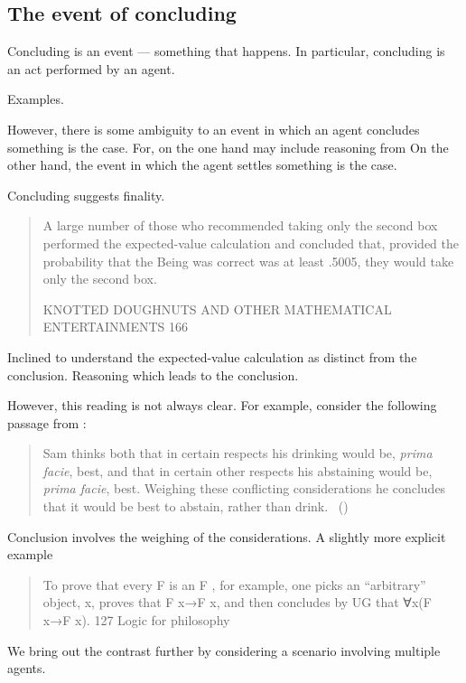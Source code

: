 \subsection{The event of concluding}
\label{cha:introduction:sec:concluding:event}

\begin{note}
  Concluding is an event --- something that happens.
  In particular, concluding is an act performed by an agent.

  Examples.
\end{note}

\begin{note}
  However, there is some ambiguity to an event in which an agent concludes something is the case.
  For, on the one hand may include reasoning from
  On the other hand, the event in which the agent settles something is the case.

  Concluding suggests finality.

  \begin{quote}
    A large number of those who recommended taking only the second box performed the expected-value calculation and concluded that, provided the probability that the Being was correct was at least .5005, they would take only the second box.

    KNOTTED DOUGHNUTS AND OTHER MATHEMATICAL ENTERTAINMENTS 166
  \end{quote}

  Inclined to understand the expected-value calculation as distinct from the conclusion.
  Reasoning which leads to the conclusion.

  However, this reading is not always clear.
  For example, consider the following passage from \citeyear{Bratman:1979aa}:

  \begin{quote}
    Sam thinks both that in certain respects his drinking would be, \emph{prima facie}, best, and that in certain other respects his abstaining would be, \emph{prima facie}, best.
    Weighing these conflicting considerations he concludes that it would be best to abstain, rather than drink.%
    \mbox{ }\hfill\mbox{(\citeyear[156]{Bratman:1979aa})}
  \end{quote}

  Conclusion involves the weighing of the considerations.
  A slightly more explicit example

  \begin{quote}
    To prove that every F is an F , for example, one picks an “arbitrary” object, x, proves that F x→F x, and then concludes by UG that ∀x(F x→F x). 127 Logic for philosophy
  \end{quote}

  We bring out the contrast further by considering a scenario involving multiple agents.
\end{note}

